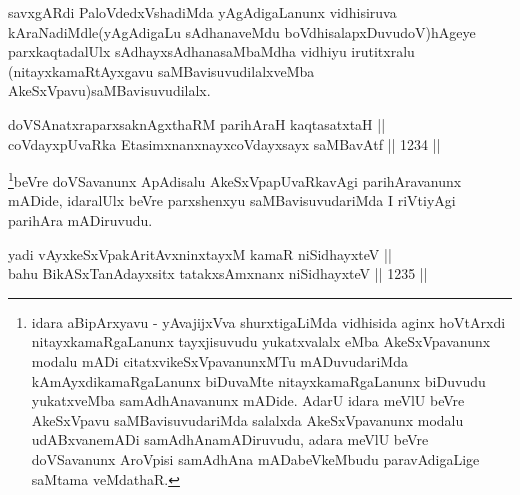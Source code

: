 \begin{artha}
savxgARdi PaloVdedxVshadiMda yAgAdigaLanunx vidhisiruva kAraNadiMdle(yAgAdigaLu sAdhanaveMdu boVdhisalapxDuvudoV)hAgeye parxkaqtadalUlx sAdhayxsAdhanasaMbaMdha vidhiyu irutitxralu (nitayxkamaRtAyxgavu saMBavisuvudilalxveMba AkeSxVpavu)saMBavisuvudilalx.
\end{artha}


\begin{shl}
doVSAnatxraparxsaknAgxthaRM parihAraH kaqtasatxtaH || \\
coVdayxpUvaRka EtasimxnanxnayxcoVdayxsayx saMBavAtf \hfill || 1234 ||   
\end{shl}

\begin{artha}
\footnote{idara aBipArxyavu - yAvajijxVva shurxtigaLiMda vidhisida aginx hoVtArxdi nitayxkamaRgaLanunx tayxjisuvudu yukatxvalalx eMba AkeSxVpavanunx modalu mADi citatxvikeSxVpavanunxMTu mADuvudariMda kAmAyxdikamaRgaLanunx biDuvaMte nitayxkamaRgaLanunx biDuvudu yukatxveMba samAdhAnavanunx mADide. AdarU idara meVlU beVre AkeSxVpavu saMBavisuvudariMda salalxda AkeSxVpavanunx modalu udABxvanemADi samAdhAnamADiruvudu, adara meVlU beVre doVSavanunx AroVpisi samAdhAna mADabeVkeMbudu  paravAdigaLige saMtama veMdathaR.}beVre doVSavanunx ApAdisalu AkeSxVpapUvaRkavAgi parihAravanunx mADide, idaralUlx beVre parxshenxyu saMBavisuvudariMda I riVtiyAgi parihAra mADiruvudu.
\end{artha}


\begin{shl}
\footnotemark[2]yadi vAyxkeSxVpakAritAvxninxtayxM kamaR niSidhayxteV || \\
bahu BikASxTanAdayxsitx tatakxsAmxnanx niSidhayxteV \hfill || 1235 ||  
\end{shl}

